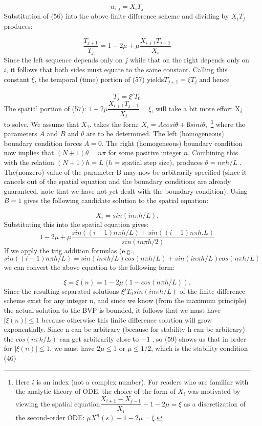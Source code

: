 \documentclass[../main.tex]{subfiles}
\begin{document}
\begin{equation}
u_{i,j}=X_iT_j
\end{equation}
Substitution of (56) into the above finite difference scheme and dividing by $X_iT_j$ produces: 

\begin{equation}
\dfrac{T_{j+1}}{T_j}=1-2\mu+\mu \dfrac{X_{i+1}T_{j-1}}{X_i}
\end{equation}
Since the left sequence depends only on $j$ while that on the right depends only on $i$, it follows that both sides must equate to the same constant. Calling this constant $\xi$, the temporal (time) portion of (57) yields$T_{j+1} = \xi T_j$ and hence

\begin{equation}
T_j = \xi^jT_0
\end{equation}
The spatial portion of (57): $1-2 \mu \dfrac{X_{i+1}T_{j-1}}{X_i}=\xi$, will take a bit more effort 
X¡ 
to solve. We assume that $X_1$. takes the form: $X_i = Acosi\theta + ßsin i\theta,$
\footnote{Here $i$ is an index (not a complex number). For readers who are familiar with the analytic theory of ODE, the choice of the form of $X_i$ was motivated by viewing the spatial equation$\dfrac{X_{i+1} - X_{j-1}}{X_i}  + 1-2\mu = \xi$ as a discretization of the second-order ODE: $\mu X^n (s) +1 -2 \mu = \xi$.}
where the parameters $A$ and $B$ and $\theta$ are to be determined. The left (homogeneous) boundary condition forces $A = 0$. The right (homogeneous) boundary condition now implies that $(N +1)\theta = n\pi$ for some positive integer $n$. Combining this with the relation $(N + 1)h = L$ ($h$  = spatial step size), produces $\theta = n\pi h/L$ . The(nonzero) value of the parameter B may now be arbitrarily specified (since it cancels out of the spatial equation and the boundary conditions are already guaranteed, note that we have not yet dealt with the boundary condition). Using $B = 1$ gives the following candidate solution to the spatial equation: 

\begin{equation}
X_i=sin(in\pi h/L).
\end{equation}
Substituting this into the spatial equation gives: 
$$1-2\mu+\mu \dfrac{sin((i+1)n \pi h/L) + sin((i-1)n\pi h.L)}{sin(in\pi h/2)}$$
If we apply the trig addition formulas (e.g.,  $sin((i+1)n \pi h/L)= sin(in \pi h/L)cos(n\pi h/L) +sin(in \pi h/L)cos(n\pi h/L)$ we can convert the above equation to the following form: 

\begin{equation}
\xi = \xi(n)=1-2\mu (1-cos(n\pi h/L)).
\end{equation}
Since the resulting separated solutions $\xi^j T_0 sin(in\pi h/L)$ of the finite difference scheme exist for any integer n, and since we know (from the maximum principle) the actual solution to the BVP is bounded, it follows that we must have $| \xi(n)| \leqslant 1$ because otherwise this finite difference solution will grow exponentially. Since n can be arbitrary (because for stability h can be arbitrary) the $cos(n\pi h/L)$ can get arbitrarily close to $-1$ , so (59) shows us that in order for $| \xi(n) | \leqslant 1$, we must have $2\mu \leqslant 1 $ or $\mu \leqslant 1 / 2$, which is the stability condition (46)
\end{document}
